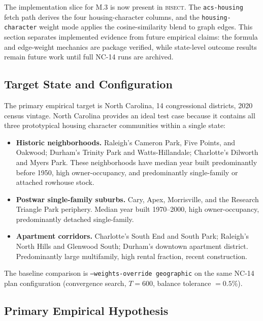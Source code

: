 \label{sec:empirical}

The implementation slice for M.3 is now present in \textsc{bisect}. The
\texttt{acs-housing} fetch path derives the four housing-character columns, and
the \texttt{housing-character} weight mode applies the cosine-similarity blend
to graph edges. This section separates implemented evidence from future
empirical claims: the formula and edge-weight mechanics are package verified,
while state-level outcome results remain future work until full NC-14 runs are
archived.

\subsection{Target State and Configuration}

The primary empirical target is North Carolina, 14 congressional districts,
2020 census vintage.
North Carolina provides an ideal test case because it contains all three
prototypical housing character communities within a single state:
\begin{itemize}
  \item \textbf{Historic neighborhoods.}
    Raleigh's Cameron Park, Five Points, and Oakwood;
    Durham's Trinity Park and Watts-Hillandale;
    Charlotte's Dilworth and Myers Park.
    These neighborhoods have median year built predominantly before 1950,
    high owner-occupancy, and predominantly single-family or attached rowhouse
    stock.
  \item \textbf{Postwar single-family suburbs.}
    Cary, Apex, Morrisville, and the Research Triangle Park periphery.
    Median year built 1970--2000, high owner-occupancy, predominantly detached
    single-family.
  \item \textbf{Apartment corridors.}
    Charlotte's South End and South Park; Raleigh's North Hills and Glenwood
    South; Durham's downtown apartment district.
    Predominantly large multifamily, high rental fraction, recent construction.
\end{itemize}

The baseline comparison is \texttt{--weights-override geographic} on the same
NC-14 plan configuration (convergence search, $T = 600$, balance tolerance
$= 0.5\%$).

\subsection{Primary Empirical Hypothesis}

